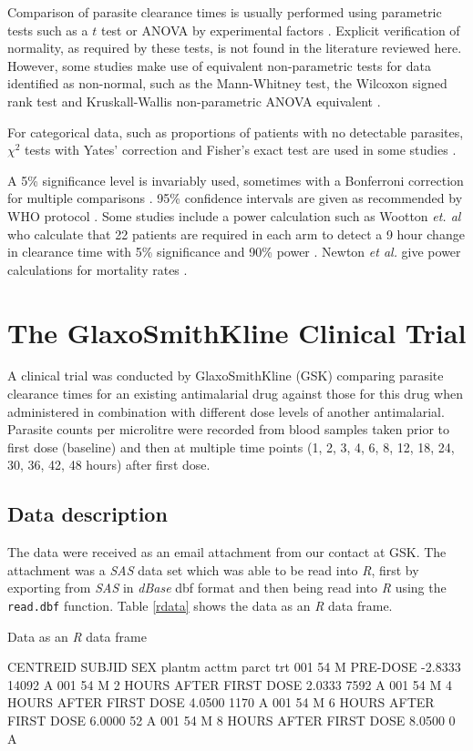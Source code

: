 Comparison of parasite clearance times is usually performed using parametric tests such as a $t$ test or ANOVA by experimental factors \cite{smithuis, vries, wootton, carmello}. Explicit verification of normality, as required by these tests, is not found in the literature reviewed here. However, some studies make use of equivalent non-parametric tests for data identified as non-normal, such as the Mann-Whitney test, the Wilcoxon signed rank test \cite{newton, carmello} and Kruskall-Wallis non-parametric ANOVA equivalent \cite{pukri}.\label{stat-tests}

For categorical data, such as proportions of patients with no detectable parasites, $\chi^{2}$ tests with Yates' correction and Fisher's exact test are used in some studies \cite{smithuis, newton}.

A 5\% significance level is invariably used, sometimes with a Bonferroni correction for multiple comparisons \cite{newton, carmello, pukri}. 95\% confidence intervals are given as recommended by WHO protocol \cite{protocolWHO}. Some studies include a power calculation such as Wootton \textit{et. al} who calculate that 22 patients are required in each arm to detect a 9 hour change in clearance time with 5\% significance and 90\% power \cite{wootton}. Newton \textit{et al.} give power calculations for mortality rates \cite{newton}.

\section{The GlaxoSmithKline Clinical Trial}
A clinical trial was conducted by GlaxoSmithKline (GSK) comparing parasite clearance times for an existing antimalarial drug against those for this drug when administered in combination with different dose levels of another antimalarial. Parasite counts per microlitre were recorded from blood samples taken prior to first dose (baseline) and then at multiple time points (1, 2, 3, 4, 6, 8, 12, 18, 24, 30, 36, 42, 48 hours) after first dose.

\subsection{Data description}
The data were received as an email attachment from our contact at GSK. The attachment was a \emph{SAS} data set which was able to be read into \emph{R}, first by exporting from \emph{SAS} in \emph{dBase} dbf format and then being read into \emph{R} using the \texttt{read.dbf} function.
Table \ref{rdata} shows the data as an \emph{R} data frame. 
\begin{table}[h]
\centering
\caption{Data as an \emph{R} data frame}\label{rdata}
\begin{boxedverbatim}
CENTREID SUBJID SEX                    plantm   acttm  parct trt
     001     54   M                  PRE-DOSE -2.8333  14092   A  
     001     54   M  2 HOURS AFTER FIRST DOSE  2.0333   7592   A  
     001     54   M  4 HOURS AFTER FIRST DOSE  4.0500   1170   A  
     001     54   M  6 HOURS AFTER FIRST DOSE  6.0000     52   A  
     001     54   M  8 HOURS AFTER FIRST DOSE  8.0500      0   A  
\end{boxedverbatim}
\end{table}

